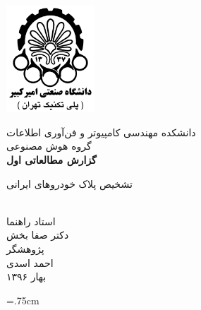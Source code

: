 \documentclass[12pt,a4paper]{article}
\begin{document}
\thispagestyle{empty}
\vspace*{-25mm}
\centerline{\includegraphics[height=4cm]{Imgs/logo.png}}

\begin{center}
\vspace{-3mm}
دانشکده مهندسی کامپیوتر و فن‌آوری اطلاعات
\\[.2cm]

گروه هوش مصنوعی
\\[1cm]
{\Large 
\textbf{گزارش مطالعاتی اول}
}
\\[.4cm]
\baselineskip=2cm
{\titr
\begin{Huge}
تشخیص پلاک خودروهای ایرانی
\end{Huge}}
\\[1cm]
{\Large {\traffic 
استاد راهنما
}
\\[.7cm]
{\Large \nastaliq دکتر صفا بخش }
\\[.7cm]
{\Large\traffic  پژوهشگر
}}
\\[.6cm]
{\Large \nastaliq احمد اسدی}
\\[.2cm]
 بهار ۱۳۹۶
\end{center}

\newpage
\baselineskip=1cm
\tableofcontents
\newpage
\baselineskip=.75cm
\end{document}
